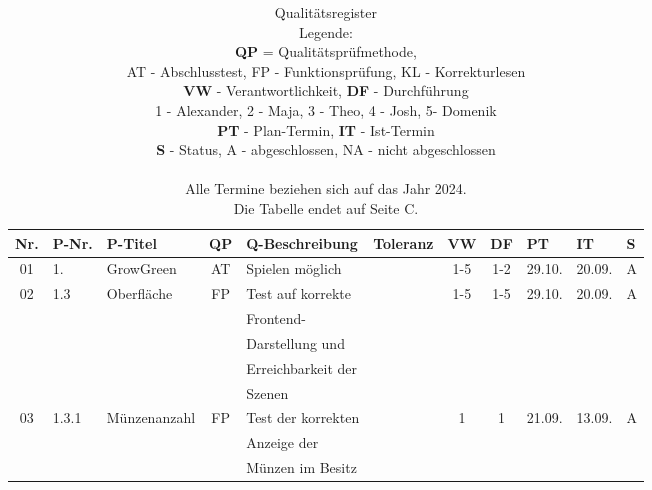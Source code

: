 \label{ch:anhang}
\footnotesize


\begin{longtable}{|c|l|l|c|l|l|c|c|l|l|l|}
    \caption[Qualitätsregister]{Qualitätsregister \\ Legende: \\
            \textbf{QP} = Qualitätsprüfmethode, \\
            AT - Abschlusstest, FP - Funktionsprüfung, KL - Korrekturlesen \\
            \textbf{VW} - Verantwortlichkeit, \textbf{DF} - Durchführung\\
            1 - Alexander, 2 - Maja, 3 - Theo, 4 - Josh, 5- Domenik \\
            \textbf{PT} - Plan-Termin, \textbf{IT} - Ist-Termin\\
            \textbf{S} - Status, A - abgeschlossen, NA - nicht abgeschlossen \\\\
            Alle Termine beziehen sich auf das Jahr 2024.\\
            Die Tabelle endet auf Seite C.\\}
    \label{tab:quality}\\
            \hline
            Nr. & P-Nr. & P-Titel & QP & Q-Beschreibung & Toleranz & VW & DF & PT & IT & S \\[0.5ex]
            \hline\hline
            01 & 1. & GrowGreen & AT & Spielen möglich & & 1-5 & 1-2 & 29.10. & 20.09. & A \\
            \hline
            02 & 1.3 & Oberfläche & FP & Test auf korrekte &  & 1-5 & 1-5 & 29.10. & 20.09. & A \\
               &       &            &    & Frontend- &   &   & & & &\\
               &       &            &    & Darstellung und &   &   & & & &\\
               &       &            &    & Erreichbarkeit der &   &   & & & &\\
               &       &            &    & Szenen &   &   & & & &\\
            \hline
            03 & 1.3.1 & Münzenanzahl & FP & Test der korrekten &  & 1 & 1 & 21.09. & 13.09. & A \\
            &       &            &    & Anzeige der &   &   & & & &\\
            &       &            &    & Münzen im Besitz &   &   & & & &\\
            \hline

\end{longtable}

